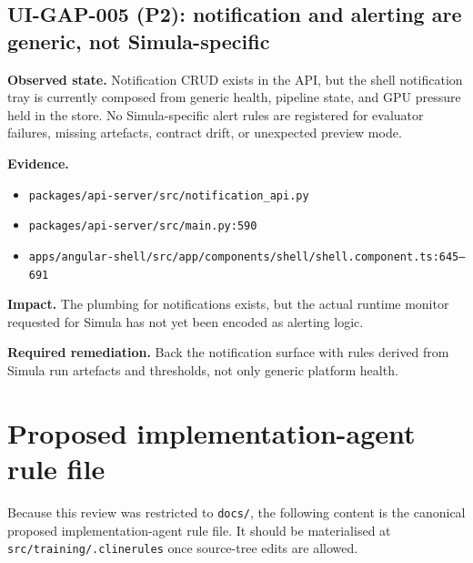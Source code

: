 \subsection*{UI-GAP-005 (P2): notification and alerting are generic, not Simula-specific}
\textbf{Observed state.}
Notification CRUD exists in the API, but the shell notification tray
is currently composed from generic health, pipeline state, and GPU
pressure held in the store. No Simula-specific alert rules are
registered for evaluator failures, missing artefacts, contract drift,
or unexpected preview mode.

\textbf{Evidence.}
\begin{itemize}
  \item \texttt{packages/api-server/src/notification\_api.py}
  \item \texttt{packages/api-server/src/main.py:590}
  \item \texttt{apps/angular-shell/src/app/components/shell/shell.component.ts:645--691}
\end{itemize}

\textbf{Impact.}
The plumbing for notifications exists, but the actual runtime monitor
requested for Simula has not yet been encoded as alerting logic.

\textbf{Required remediation.}
Back the notification surface with rules derived from Simula run
artefacts and thresholds, not only generic platform health.

\section{Proposed implementation-agent rule file}
\label{sec:simula-proposed-clinerules}
Because this review was
restricted to \texttt{docs/}, the following content is the canonical
proposed implementation-agent rule file. It should be materialised at
\texttt{src/training/.clinerules} once source-tree edits are allowed.

